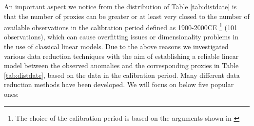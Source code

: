 \documentclass[11pt]{amsart}
\theoremstyle{plain}
\theoremstyle{definition}
\theoremstyle{remark}
\begin{document}
An important aspect we notice from the distribution of Table
\ref{tab:distdate} is that the number of proxies can be greater or at least very
closed to the number of available observations in the calibration period defined as
1900-2000CE \footnote{The choice of the calibration period is based on the
  arguments shown in \cite{Barboza2014}} (101 observations), which can cause overfitting issues or
dimensionality problems in the use of classical linear models. Due to the above
reasons we investigated various data reduction techniques with the aim of establishing 
a reliable linear model between the observed anomalies and the corresponding proxies in
Table \ref{tab:distdate}, based on the data in the calibration
period. Many different data reduction methods have been developed. We will focus on below five popular ones:  
\end{document}
